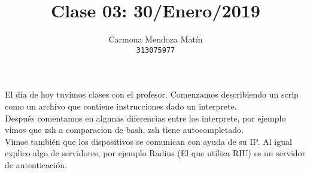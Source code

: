\documentclass[11pt, a4paper]{report}
\begin{document}
\title{Clase 03: 30/Enero/2019}
\author{
  Carmona Mendoza Mat\'in\\
  \texttt{313075977}
}
\date{}
\maketitle

El d\'ia de hoy tuvimos clases con el profesor. Comenzamos describiendo un scrip como un archivo
que contiene instrucciones dado un interprete. \\

Despu\'es comentamos en algunas diferencias entre los interprete, por ejemplo vimos que zsh a comparacion
de bash, zsh tiene autocompletado. \\

Vimos tambi\'en que los dispositivos se comunican con ayuda de su IP. Al igual explico algo de servidores, por ejemplo Radius (El que utiliza RIU) es un servidor de autenticaci\'on. 
  
\end{document}

